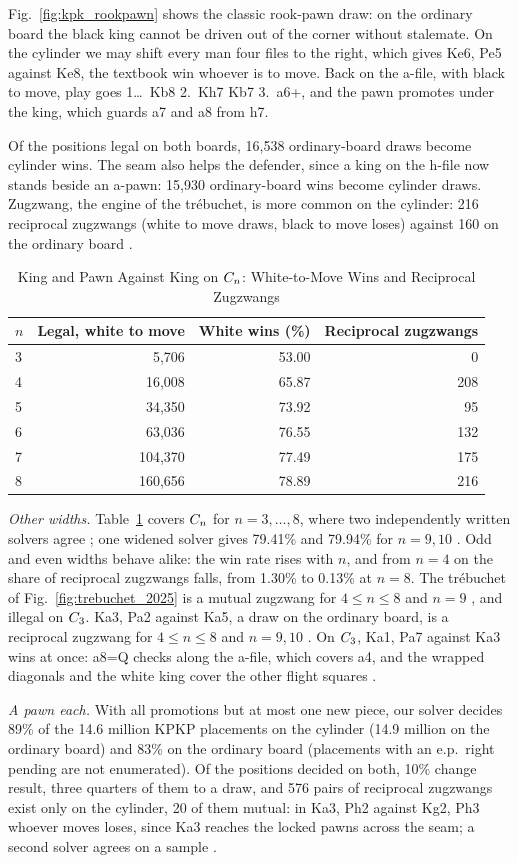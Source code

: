 Fig.~\ref{fig:kpk_rookpawn} shows the classic rook-pawn draw: on the ordinary board the black king cannot be
driven out of the corner without stalemate. On the cylinder we may shift every man four files to the right,
which gives Ke6, Pe5 against Ke8, the textbook win whoever is to move. Back on the a-file, with black to move,
play goes 1\ldots~Kb8 2.~Kh7 Kb7 3.~a6+, and the pawn promotes under the king, which guards a7 and a8 from h7.

Of the positions legal on both boards, 16,538 ordinary-board draws become cylinder wins. The seam also
helps the defender, since a king on the h-file now stands beside an a-pawn: 15,930 ordinary-board wins
become cylinder draws. Zugzwang, the engine of the tr\'ebuchet, is more common on the cylinder: 216
reciprocal zugzwangs (white to move draws, black to move loses) against 160 on the ordinary board
.

\begin{table}[!t]
\centering
\caption{King and Pawn Against King on $C_{n}$: White-to-Move Wins and Reciprocal Zugzwangs }
\label{tab:oddw}
\footnotesize
\begin{tabular}{@{}lrrr@{}}
\toprule
$n$ & Legal, white to move & White wins (\%) & Reciprocal zugzwangs \\
\midrule
3 & 5,706   & 53.00 & 0   \\
4 & 16,008  & 65.87 & 208 \\
5 & 34,350  & 73.92 & 95  \\
6 & 63,036  & 76.55 & 132 \\
7 & 104,370 & 77.49 & 175 \\
8 & 160,656 & 78.89 & 216 \\
\bottomrule
\end{tabular}
\end{table}

\emph{Other widths.} Table~\ref{tab:oddw} covers $C_{n}$ for $n=3,\dots,8$, where two independently
written solvers agree ; one widened solver gives 79.41\% and 79.94\% for $n=9,10$ . Odd
and even widths behave alike: the win rate rises with $n$, and from $n=4$ on the share of reciprocal zugzwangs falls,
from 1.30\% to 0.13\% at $n=8$. The tr\'ebuchet of Fig.~\ref{fig:trebuchet_2025} is a mutual zugzwang for $4\le n\le8$  and $n=9$ , and illegal on $C_{3}$. Ka3, Pa2 against
Ka5, a draw on the ordinary board, is a reciprocal zugzwang for $4\le n\le8$  and $n=9,10$ . On $C_{3}$, Ka1, Pa7 against Ka3
wins at once: a8=Q checks along the a-file, which covers a4, and the wrapped diagonals and the white king cover
the other flight squares .

\emph{A pawn each.} With all promotions but at most one new piece, our solver decides 89\% of the 14.6 million
KPKP placements on the cylinder (14.9 million on the ordinary board) and 83\% on the ordinary board 
(placements with an e.p.\ right pending are not enumerated). Of the positions decided on both,
10\% change result, three quarters of them to a draw, and 576 pairs of reciprocal zugzwangs exist only on the
cylinder, 20 of them mutual: in Ka3, Ph2 against Kg2, Ph3 whoever moves loses, since Ka3 reaches the
locked pawns across the seam; a second solver agrees on a sample .
